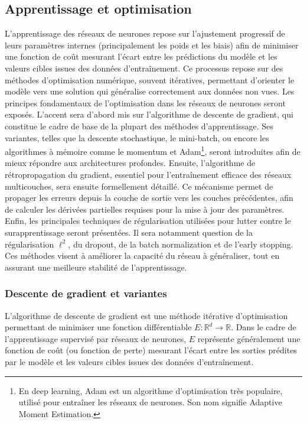 \subsection{Apprentissage et optimisation}

L’apprentissage des réseaux de neurones repose sur l’ajustement progressif de leurs paramètres internes (principalement les poids et les biais) afin de minimiser une fonction de coût mesurant l’écart entre les prédictions du modèle et les valeurs cibles issues des données d’entraînement. Ce processus repose sur des méthodes d’optimisation numérique, souvent itératives, permettant d’orienter le modèle vers une solution qui généralise correctement aux données non vues. Les principes fondamentaux de l’optimisation dans les réseaux de neurones seront exposés. L’accent sera d’abord mis sur l’algorithme de descente de gradient, qui constitue le cadre de base de la plupart des méthodes d’apprentissage. Ses variantes, telles que la descente stochastique, le mini-batch, ou encore les algorithmes à mémoire comme le momentum et Adam\footnote{En deep learning, Adam est un algorithme d’optimisation très populaire, utilisé pour entraîner les réseaux de neurones. Son nom signifie Adaptive Moment Estimation.}, seront introduites afin de mieux répondre aux architectures profondes. Ensuite, l’algorithme de rétropropagation du gradient, essentiel pour l’entraînement efficace des réseaux multicouches, sera ensuite formellement détaillé. Ce mécanisme permet de propager les erreurs depuis la couche de sortie vers les couches précédentes, afin de calculer les dérivées partielles requises pour la mise à jour des paramètres. Enfin, les principales techniques de régularisation utilisées pour lutter contre le surapprentissage seront présentées. Il sera notamment question de la régularisation $\ell^2$, du dropout, de la batch normalization et de l’early stopping. Ces méthodes visent à améliorer la capacité du réseau à généraliser, tout en assurant une meilleure stabilité de l’apprentissage.

\subsubsection{Descente de gradient et variantes}

L'algorithme de descente de gradient est une méthode itérative d'optimisation permettant de minimiser une fonction différentiable \( E: \mathbb{R}^d \to \mathbb{R} \). Dans le cadre de l'apprentissage supervisé par réseaux de neurones, \( E \) représente généralement une fonction de coût (ou fonction de perte) mesurant l'écart entre les sorties prédites par le modèle et les valeurs cibles issues des données d’entraînement.

